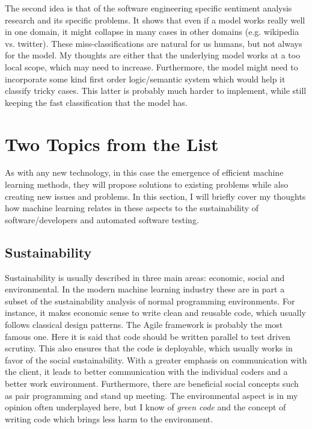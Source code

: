 \documentclass[11pt]{article}
\begin{document}
The second idea is that of the software engineering specific sentiment analysis research and its specific problems. It shows that even if a model works really well in one domain, it might collapse in many cases in other domains (e.g. wikipedia vs. twitter). These miss-classifications are natural for us humans, but not always for the model. My thoughts are either that the underlying model works at a too local scope, which may need to increase. Furthermore, the model might need to incorporate some kind first order logic/semantic system which would help it classify tricky cases. This latter is probably much harder to implement, while still keeping the fast classification that the model has. 

\section*{Two Topics from the List}
As with any new technology, in this case the emergence of efficient machine learning methods, they will propose solutions to existing problems while also creating new issues and problems. In this section, I will briefly cover my thoughts how machine learning relates in these aspects to the sustainability of software/developers and automated software testing.

\subsection*{Sustainability}

Sustainability is usually described in three main areas: economic, social and environmental. In the modern machine learning industry these are in part a subset of the sustainability analysis of normal programming environments. For instance, it makes economic sense to write clean and reusable code, which usually follows classical design patterns. The Agile framework is probably the most famous one. Here it is said that code should be written parallel to test driven scrutiny. This also ensures that the code is deployable, which usually works in favor of the social sustainability. With a greater emphasis on communication with the client, it leads to better communication with the individual coders and a better work environment. Furthermore, there are beneficial social concepts such as pair programming and stand up meeting. The environmental aspect is in my opinion often underplayed here, but I know of \textit{green code} and the concept of writing code which brings less harm to the environment.
\end{document}
